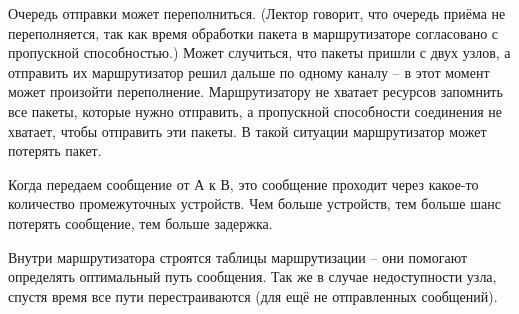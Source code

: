 Очередь отправки может переполниться. (Лектор говорит, что очередь приёма не переполняется, так как время обработки пакета в маршрутизаторе согласовано с пропускной способностью.) Может случиться, что пакеты пришли с двух узлов, а отправить их маршрутизатор решил дальше по одному каналу -- в этот момент может произойти переполнение.
Маршрутизатору не хватает ресурсов запомнить все пакеты, которые нужно отправить, а пропускной способности соединения не хватает, чтобы отправить эти пакеты. В такой ситуации маршрутизатор может потерять пакет.

Когда передаем сообщение от А к В, это сообщение проходит через какое-то количество промежуточных устройств. Чем больше устройств, тем больше шанс потерять сообщение, тем больше задержка.

Внутри маршрутизатора строятся таблицы маршрутизации -- они помогают определять оптимальный путь сообщения. Так же в случае недоступности узла, спустя время все пути перестраиваются (для ещё не отправленных сообщений).